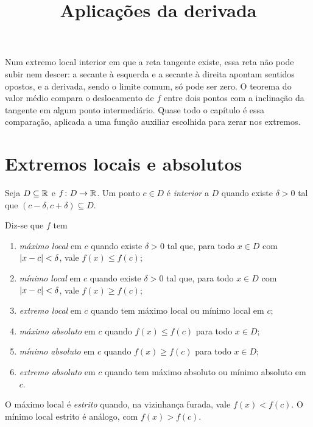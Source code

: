 \documentclass[11pt,a4paper]{article}
\title{Aplicações da derivada}
\author{}
\date{}
\begin{document}
\maketitle
\tableofcontents


\begin{intuicao}
Num extremo local interior em que a reta tangente existe, essa reta não pode subir nem descer: a secante à esquerda e a secante à direita apontam sentidos opostos, e a derivada, sendo o limite comum, só pode ser zero. O teorema do valor médio compara o deslocamento de $f$ entre dois pontos com a inclinação da tangente em algum ponto intermediário. Quase todo o capítulo é essa comparação, aplicada a uma função auxiliar escolhida para zerar nos extremos.
\end{intuicao}

\section{Extremos locais e absolutos}

\begin{definicao}
Seja $D\subseteq\mathbb{R}$ e $f\colon D\to\mathbb{R}$. Um ponto $c\in D$ é \emph{interior} a $D$ quando existe $\delta>0$ tal que $(c-\delta,c+\delta)\subseteq D$.

Diz-se que $f$ tem
\begin{enumerate}
\item \emph{máximo local} em $c$ quando existe $\delta>0$ tal que, para todo $x\in D$ com $\left\lvert x-c \right\rvert<\delta$, vale $f(x)\le f(c)$;
\item \emph{mínimo local} em $c$ quando existe $\delta>0$ tal que, para todo $x\in D$ com $\left\lvert x-c \right\rvert<\delta$, vale $f(x)\ge f(c)$;
\item \emph{extremo local} em $c$ quando tem máximo local ou mínimo local em $c$;
\item \emph{máximo absoluto} em $c$ quando $f(x)\le f(c)$ para todo $x\in D$;
\item \emph{mínimo absoluto} em $c$ quando $f(x)\ge f(c)$ para todo $x\in D$;
\item \emph{extremo absoluto} em $c$ quando tem máximo absoluto ou mínimo absoluto em $c$.
\end{enumerate}
O máximo local é \emph{estrito} quando, na vizinhança furada, vale $f(x)<f(c)$. O mínimo local estrito é análogo, com $f(x)>f(c)$.
\end{definicao}
\end{document}
